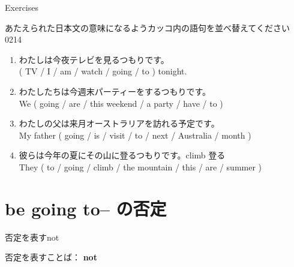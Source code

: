 \documentclass[aspectratio=169,xcolor={dvipsnames,table}]{beamer}
\newcommand{\myaudio}[1]{\href{#1}{\faVolumeUp}}
\begin{document}
\begin{frame}[plain]{Exercises}

 {\small あたえられた日本文の意味になるようカッコ内の語句を並べ替えてください}\hfill{\tiny 0214}\,{\scriptsize \myaudio{./audio/011_be_going_to_02.mp3}}


\begin{enumerate}
 \item わたしは今夜テレビを見るつもりです。\\
( TV / I / am / watch / going / to ) tonight.\\
 \item わたしたちは今週末パーティーをするつもりです。\\
We ( going / are / this weekend / a party / have / to )\\
 \item わたしの父は来月オーストラリアを訪れる予定です。\\
My father ( going / is / visit / to / next / Australia / month )\\
 \item 彼らは今年の夏にその山に登るつもりです。\hfill{\scriptsize climb  登る}\\
They ( to / going / climb / the mountain / this / are / summer )\\
\end{enumerate}
\end{frame}

\section{be going to-- の否定}
\begin{frame}[plain]{否定を表すnot}
 \Large

否定を表すことば： {\LARGE\bfseries not}\hspace{20pt}
\end{frame}
\end{document}
